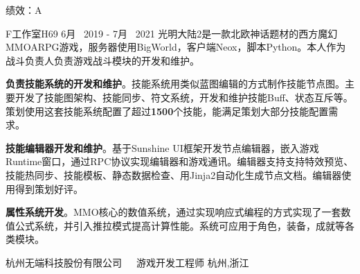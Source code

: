 \begin{cventries}
\cventrycompany
{绩效：A} %
{~} %

\cventryproject
{F工作室H69} %
{6月~ 2019 - 7月~ 2021} %
{光明大陆2是一款北欧神话题材的西方魔幻MMOARPG游戏，服务器使用BigWorld，客户端Neox，脚本Python。本人作为战斗负责人负责游戏战斗模块的开发和维护。}
{ %
	\begin{cvitems}
		\item {\textbf{负责技能系统的开发和维护}。技能系统用类似蓝图编辑的方式制作技能节点图。主要开发了技能图架构、技能同步、符文系统，开发和维护技能Buff、状态互斥等。策划使用这套技能系统配置了超过\textbf{1500}个技能，能满足策划大部分技能配置需求。}
		\item{\textbf{技能编辑器开发和维护}。基于Sunshine UI框架开发节点编辑器，嵌入游戏Runtime窗口，通过RPC协议实现编辑器和游戏通讯。编辑器支持支持特效预览、技能热同步、技能模板、静态数据检查、用Jinja2自动化生成节点文档。编辑器使用得到策划好评。}
		\item{\textbf{属性系统开发}。MMO核心的数值系统，通过实现响应式编程的方式实现了一套数值公式系统，并引入推拉模式提高计算性能。系统可应用于角色，装备，成就等各类模块。}
	\end{cvitems}
}



\cventrycompany
{杭州无端科技股份有限公司~~~游戏开发工程师} %
{杭州,浙江} %


\end{cventries}
